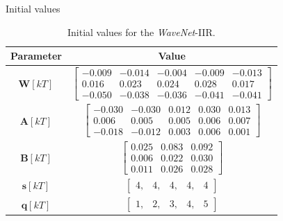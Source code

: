 \documentclass{beamer}
\begin{document}
\begin{frame}{Initial values}
\small{
\begin{table}[H]
        \centering
        \caption{Initial values for the \textit{WaveNet}-IIR.}
        \label{tab:init values morlet}
        \begin{tabular}{cc}
            \hline
            \textbf{Parameter} & \textbf{Value} \\ \hline   \hline
            $\bm{W}[kT]$ &  $
                    \begin{bmatrix}
                    -0.009 & -0.014 & -0.004 & -0.009 & -0.013 \\
                    0.016 & 0.023 & 0.024 & 0.028 & 0.017 \\
                    -0.050 & -0.038 & -0.036 & -0.041 & -0.041
                    \end{bmatrix}
                    $ \\ \vspace{.1 cm}
            $\bm{A}[kT]$ &   $
                    \begin{bmatrix}
                    -0.030 & -0.030 & 0.012 & 0.030 & 0.013 \\
                    0.006 & 0.005 & 0.005 & 0.006 & 0.007 \\
                    -0.018 & -0.012 & 0.003 & 0.006 & 0.001
                    \end{bmatrix}
                    $ \\ \vspace{.1 cm}
            $\bm{B}[kT]$ &  $
                    \begin{bmatrix}
                    0.025 & 0.083 & 0.092 \\
                    0.006 & 0.022 & 0.030 \\
                    0.011 & 0.026 & 0.028
                    \end{bmatrix}
                    $ \\ \vspace{.1 cm}
            $\bm{s}[kT]$ &   $\begin{bmatrix} 4, & 4, & 4, &  4, & 4\end{bmatrix} $ \\ \vspace{.1 cm}
            $\bm{q}[kT]$ &   $\begin{bmatrix}  1, &  2, &  3, & 4, & 5\end{bmatrix} $ \\
            \hline   \hline
        \end{tabular}
    \end{table}
}
\end{frame}
\end{document}

